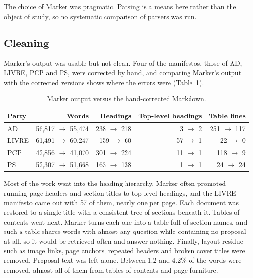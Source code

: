 The choice of Marker was pragmatic. Parsing is a means here rather than the object of
study, so no systematic comparison of parsers was run.

\subsection{Cleaning} \label{subsec:cleaning}

Marker's output was usable but not clean. Four of the manifestos, those of AD,
LIVRE, PCP and PS, were corrected by hand, and comparing Marker's output with
the corrected versions shows where the errors were (Table~\ref{tab:cleaning}).

\begin{table}[h]
    \centering
    \begin{tabular}{|l|r|r|r|r|}
        \hline
        \textbf{Party} & \textbf{Words} & \textbf{Headings} & \textbf{Top-level headings} & \textbf{Table lines} \\
        \hline
        AD    & 56{,}817 $\rightarrow$ 55{,}474 & 238 $\rightarrow$ 218 &  3 $\rightarrow$ 2 & 251 $\rightarrow$ 117 \\
        LIVRE & 61{,}491 $\rightarrow$ 60{,}247 & 159 $\rightarrow$ 60  & 57 $\rightarrow$ 1 &  22 $\rightarrow$ 0 \\
        PCP   & 42{,}856 $\rightarrow$ 41{,}070 & 301 $\rightarrow$ 224 & 11 $\rightarrow$ 1 & 118 $\rightarrow$ 9 \\
        PS    & 52{,}307 $\rightarrow$ 51{,}668 & 163 $\rightarrow$ 138 &  1 $\rightarrow$ 1 &  24 $\rightarrow$ 24 \\
        \hline
    \end{tabular}
    \caption{Marker output versus the hand-corrected Markdown.}
    \label{tab:cleaning}
\end{table}

Most of the work went into the heading hierarchy. Marker often promoted
running page headers and section titles to top-level headings, and the LIVRE
manifesto came out with 57 of them, nearly one per page. Each document was
restored to a single title with a consistent tree of sections beneath it.
Tables of contents went next. Marker turns each one into a table full of
section names, and such a table shares words with almost any question while
containing no proposal at all, so it would be retrieved often and answer
nothing. Finally, layout residue such as image links, page anchors, repeated
headers and broken cover titles were removed. Proposal text was left alone.
Between 1.2 and 4.2\% of the words were removed, almost all of them from tables
of contents and page furniture.

